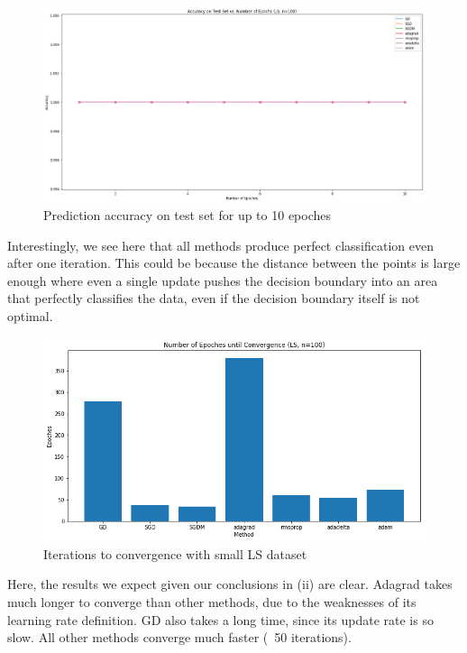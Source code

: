 \documentclass[twoside,11pt]{homework}
\begin{document}
\begin{figure}[H]
		\centering
		\includegraphics[scale=.3]{q5/sep_100/acc.png}
		\caption{Prediction accuracy on test set for up to 10 epoches}
	\end{figure}

Interestingly, we see here that all methods produce perfect classification even after one iteration. This could be because the distance between the points is large enough where even a single update pushes the decision boundary into an area that perfectly classifies the data, even if the decision boundary itself is not optimal.


\begin{figure}[H]
		\centering
		\includegraphics[scale=.5]{q5/sep_100/time.png}
		\caption{Iterations to convergence with small LS dataset}
	\end{figure}

Here, the results we expect given our conclusions in (ii) are clear. Adagrad takes much longer to converge than other methods, due to the weaknesses of its learning rate definition. GD also takes a long time, since its update rate is so slow. All other methods converge much faster (~50 iterations).
\end{document}
